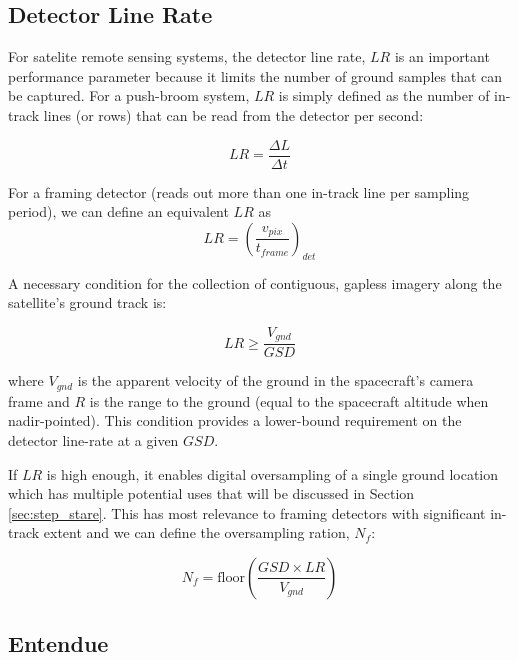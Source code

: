 \documentclass[10pt,journal]{IEEEtran}  %
\begin{document}
\subsection{Detector Line Rate}
For satelite remote sensing systems, the detector line rate, $LR$ is an important performance parameter because it limits the number of ground samples that can be captured.  For a push-broom system, $LR$ is simply defined as the number of in-track lines (or rows) that can be read from the detector per second:

$$LR = \frac{\Delta L}{\Delta t}$$

For a framing detector (reads out more than one in-track line per sampling period), we can define an equivalent $LR$ as
\begin{equation}
\label{eq:lr_framing}    
LR = \left(\frac{v_{pix}}{t_{frame}}\right)_{det}
\end{equation}

A necessary condition for the collection of contiguous, gapless imagery along the satellite's ground track is:

\begin{equation}
    LR \geq\frac{V_{gnd}}{GSD}
\end{equation}

where $V_{gnd}$ is the apparent velocity of the ground in the spacecraft's camera frame and $R$ is the range to the ground (equal to the spacecraft altitude when nadir-pointed).  This condition provides a lower-bound requirement on the detector line-rate at a given $GSD$.  

If $LR$ is high enough, it enables digital oversampling of a single ground location which has multiple potential uses that will be discussed in Section \ref{sec:step_stare}.  This has most relevance to framing detectors with significant in-track extent and we can define the oversampling ration, $N_f$:

\begin{equation}
    N_f = \text{floor}\left(\frac{GSD \times LR}{V_{gnd}}\right)
\end{equation}

\subsection{Entendue}
\label{sec:entendue}


\end{document}
